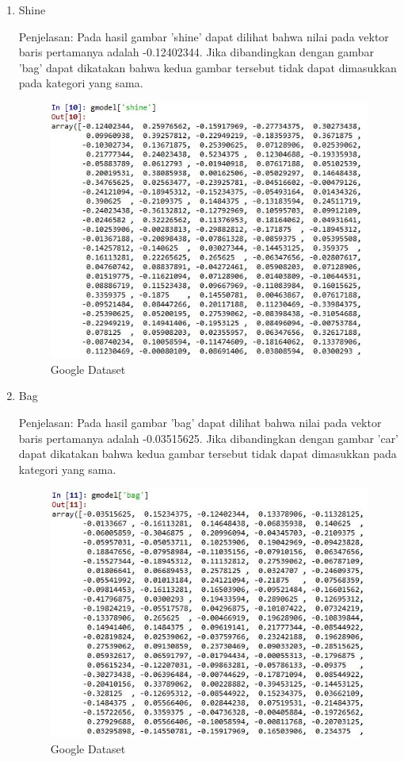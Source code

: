 \begin{enumerate}
\begin{enumerate}
\item Shine

Penjelasan: Pada hasil gambar 'shine' dapat dilihat bahwa nilai pada vektor baris pertamanya adalah -0.12402344. Jika dibandingkan dengan gambar 'bag' dapat dikatakan bahwa kedua gambar tersebut tidak dapat dimasukkan pada kategori yang sama.

\begin{figure}[!hbtp]
\centering
\includegraphics[scale=0.7]{figures/1174031/5/17shine.jpg}
\caption{Google Dataset}
\label{Google Dataset}
\end{figure}

\item Bag

Penjelasan: Pada hasil gambar 'bag' dapat dilihat bahwa nilai pada vektor baris pertamanya adalah -0.03515625. Jika dibandingkan dengan gambar 'car' dapat dikatakan bahwa kedua gambar tersebut tidak dapat dimasukkan pada kategori yang sama.

\begin{figure}[!hbtp]
\centering
\includegraphics[scale=0.7]{figures/1174031/5/18bag.jpg}
\caption{Google Dataset}
\label{Google Dataset}
\end{figure}


\end{enumerate}
\end{enumerate}
